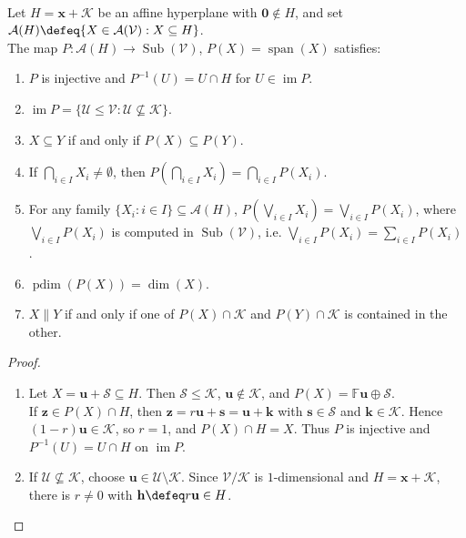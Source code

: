 \begin{theorem} \label{thm:linear-span-map-affine-to-projective} \\
Let $H=\mathbf{x}+\mathcal{K}$ be an affine hyperplane with $\mathbf{0}\notin H$, and set $\mathcal{A}(H)\defeq\{X\in\mathcal{A}(\mathcal{V}):X\subseteq H\}$.\\
The map $P:\mathcal{A}(H)\to\operatorname{Sub}(\mathcal{V})$, $P(X)=\operatorname{span}(X)$ satisfies:
\begin{enumerate}[label=(\roman*)]
\setlength{\itemsep}{0pt}
\item $P$ is injective and $P^{-1}(U)=U\cap H$ for $U\in\operatorname{im}P$.
\item $\operatorname{im}P=\{\mathcal{U}\leq\mathcal{V}:\mathcal{U}\nsubseteq\mathcal{K}\}$.
\item $X\subseteq Y$ if and only if $P(X)\subseteq P(Y)$.
\item If $\bigcap\limits_{i\in I}X_i\neq\emptyset$, then $P\left(\bigcap\limits_{i\in I}X_i\right)=\bigcap\limits_{i\in I}P(X_i)$.
\item For any family $\{X_i:i\in I\}\subseteq\mathcal{A}(H)$, $P\left(\bigvee\limits_{i\in I}X_i\right)=\bigvee\limits_{i\in I}P(X_i)$, where $\bigvee\limits_{i\in I}P(X_i)$ is computed in $\operatorname{Sub}(\mathcal{V})$, i.e. $\bigvee\limits_{i\in I}P(X_i)=\sum\limits_{i\in I}P(X_i)$.
\item $\operatorname{pdim}(P(X))=\dim(X)$.
\item $X\parallel Y$ if and only if one of $P(X)\cap\mathcal{K}$ and $P(Y)\cap\mathcal{K}$ is contained in the other.
\end{enumerate}
\begin{proof}
\begin{enumerate}[label=(\roman*)]
\setlength{\itemsep}{0pt}
\item Let $X=\mathbf{u}+\mathcal{S}\subseteq H$. Then $\mathcal{S}\leq\mathcal{K}$, $\mathbf{u}\notin\mathcal{K}$, and $P(X)=\mathbb{F}\mathbf{u}\oplus\mathcal{S}$.\\
If $\mathbf{z}\in P(X)\cap H$, then $\mathbf{z}=r\mathbf{u}+\mathbf{s}=\mathbf{u}+\mathbf{k}$ with $\mathbf{s}\in\mathcal{S}$ and $\mathbf{k}\in\mathcal{K}$. Hence $(1-r)\mathbf{u}\in\mathcal{K}$, so $r=1$, and $P(X)\cap H=X$. Thus $P$ is injective and $P^{-1}(U)=U\cap H$ on $\operatorname{im}P$.
\item If $\mathcal{U}\nsubseteq\mathcal{K}$, choose $\mathbf{u}\in\mathcal{U}\setminus\mathcal{K}$. Since $\mathcal{V}/\mathcal{K}$ is $1$-dimensional and $H=\mathbf{x}+\mathcal{K}$, there is $r\neq0$ with $\mathbf{h}\defeq r\mathbf{u}\in H$.\\

\end{enumerate}
\end{proof}
\end{theorem}

